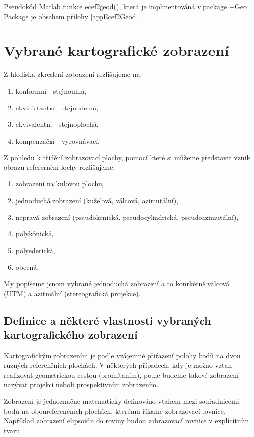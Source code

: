 \documentclass[11pt,a4paper]{article}
\begin{document}
Pseudokód Matlab funkce ecef2geod(), která je implmentováná v package +Geo Package je obsahem přílohy \ref{appEcef2Geod}.


\section{Vybrané kartografické zobrazení}

Z hlediska zkreslení zobrazení rozlišujeme na:
\begin{enumerate}
\item konformní - stejnouhlá,
\item ekvidistantní - stejnodelná,
\item ekvivalentní - stejnoplochá,
\item kompenzační - vyrovnávací.
\end{enumerate}

Z pohledu k třídění zobrazovací plochy, pomocí které si můžeme představit vznik obrazu referernční lochy rozlišujeme:
\begin{enumerate}
\item zobrazení na kulovou plochu,
\item jednoduchá zobrazení (kuželová, válcová, azimutální),
\item nepravá zobrazení (pseudokonická, pseudocylindrická, pseudoazimutální),
\item polykónická,
\item polyederická, 
\item obecná.
\end{enumerate}
My popíšeme jenom vybrané jednoduchá zobrazení a to konrkétně válcová (UTM) a azitmální (stereografická projekce).

\subsection{Definice a některé vlastnosti vybraných kartografického zobrazení}

Kartografickým zobrazením je podle \cite{Buchar2002} vzájemné přiřazení polohy bodů na dvou různých referenčních plochách. V některých případech, kdy je možno vztah realizovat geometrickou cestou (promítaním), podle \cite{Buchar2002} budeme takové zobrazení nazývat projekcí neboli prospektivním zobrazením.

Zobrazení je jednoznačne matematicky definováno vtahem mezi souřadnicemi bodů na oboureferenčních plochách, kterému říkame zobrazovací rovnice. Například zobrazení elipsoidu do roviny budou zobrazovací rovnice v explicitním tvaru
\end{document}
